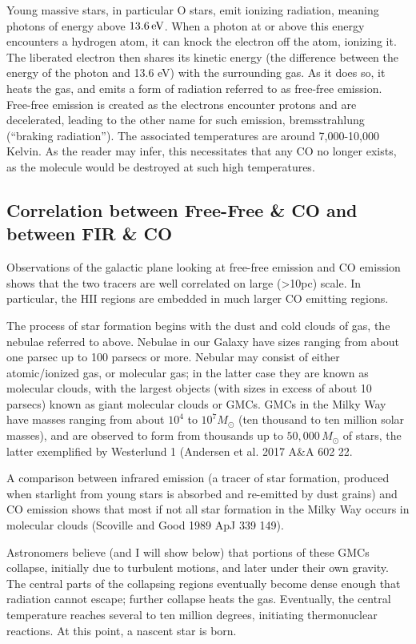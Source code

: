 \documentclass[../dissertation.tex]{subfiles}
\begin{document}
Young massive stars, in particular O stars, emit ionizing radiation, meaning photons of energy above $13.6 \,{\rm eV}$. 
When a photon at or above this energy encounters a hydrogen atom, it can knock the electron off the atom, ionizing it. 
The liberated electron then shares its kinetic energy (the difference between the energy of the photon and 13.6 eV) with the surrounding gas. 
As it does so, it heats the gas, and emits a form of radiation referred to as free-free emission. 
Free-free emission is created as the electrons encounter protons and are decelerated, leading to the other name for such emission, bremsstrahlung (``braking radiation''). 
The associated temperatures are around 7,000-10,000 Kelvin. 
As the reader may infer, this necessitates that any CO no longer exists, as the molecule would be destroyed at such high temperatures.

\subsection{Correlation between Free-Free \& CO and between FIR \& CO}

Observations of the galactic plane looking at free-free emission and CO emission shows that the two tracers are well correlated on large (>10pc) scale. In particular, the HII regions are embedded in much larger CO emitting regions. 

The process of star formation begins with the dust and cold clouds of gas, the nebulae referred to above. 
Nebulae in our Galaxy have sizes ranging from about one parsec up to 100 parsecs or more. 
Nebular may consist of either atomic/ionized gas, or molecular gas; 
in the latter case they are known as molecular clouds, with the largest objects (with sizes in excess of about 10 parsecs) known as giant molecular clouds or GMCs. 
GMCs in the Milky Way have masses ranging from about $10^4$ to $10^7M_\odot$ (ten thousand to ten million solar masses), 
and are observed to form from thousands up to $50,000\,M_\odot$ of stars, the latter exemplified by Westerlund 1 (Andersen et al. 2017 A\&A 602 22.

A comparison between infrared emission (a tracer of star formation, produced when starlight from young stars is absorbed and re-emitted by dust grains) and CO emission shows that most if not all star formation in the Milky Way occurs in molecular clouds (Scoville and Good 1989 ApJ 339 149).

Astronomers believe (and I will show below) that portions of these GMCs collapse, initially due to turbulent motions, and later under their own gravity. 
The central parts of the collapsing regions eventually become dense enough that radiation cannot escape; further collapse heats the gas. 
Eventually, the central temperature reaches several to ten million degrees, initiating  thermonuclear reactions. At this point, a nascent star is born.
\end{document}
